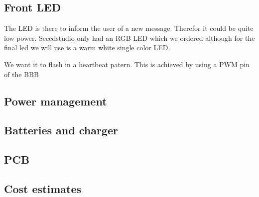 \subsection{Front LED}
The LED is there to inform the user of a new message. Therefor it could be quite low power. Seeedstudio only had an RGB LED which we ordered although for the final led we will use is a warm white single color LED.

We want it to flash in a heartbeat patern. This is achieved by using a PWM pin of the BBB
\subsection{Power management}
\subsection{Batteries and charger}
\subsection{PCB}
\subsection{Cost estimates}
